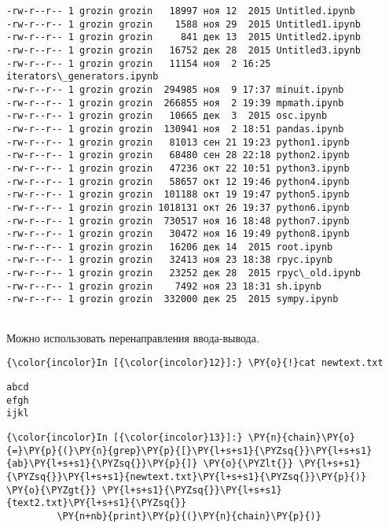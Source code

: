     \begin{Verbatim}[commandchars=\\\{\}]
-rw-r--r-- 1 grozin grozin   18997 ноя 12  2015 Untitled.ipynb
-rw-r--r-- 1 grozin grozin    1588 ноя 29  2015 Untitled1.ipynb
-rw-r--r-- 1 grozin grozin     841 дек 13  2015 Untitled2.ipynb
-rw-r--r-- 1 grozin grozin   16752 дек 28  2015 Untitled3.ipynb
-rw-r--r-- 1 grozin grozin   11154 ноя  2 16:25 iterators\_generators.ipynb
-rw-r--r-- 1 grozin grozin  294985 ноя  9 17:37 minuit.ipynb
-rw-r--r-- 1 grozin grozin  266855 ноя  2 19:39 mpmath.ipynb
-rw-r--r-- 1 grozin grozin   10665 дек  3  2015 osc.ipynb
-rw-r--r-- 1 grozin grozin  130941 ноя  2 18:51 pandas.ipynb
-rw-r--r-- 1 grozin grozin   81013 сен 21 19:23 python1.ipynb
-rw-r--r-- 1 grozin grozin   68480 сен 28 22:18 python2.ipynb
-rw-r--r-- 1 grozin grozin   47236 окт 22 10:51 python3.ipynb
-rw-r--r-- 1 grozin grozin   58657 окт 12 19:46 python4.ipynb
-rw-r--r-- 1 grozin grozin  101188 окт 19 19:47 python5.ipynb
-rw-r--r-- 1 grozin grozin 1018131 окт 26 19:37 python6.ipynb
-rw-r--r-- 1 grozin grozin  730517 ноя 16 18:48 python7.ipynb
-rw-r--r-- 1 grozin grozin   30472 ноя 16 19:49 python8.ipynb
-rw-r--r-- 1 grozin grozin   16206 дек 14  2015 root.ipynb
-rw-r--r-- 1 grozin grozin   32413 ноя 23 18:38 rpyc.ipynb
-rw-r--r-- 1 grozin grozin   23252 дек 28  2015 rpyc\_old.ipynb
-rw-r--r-- 1 grozin grozin    7492 ноя 23 18:31 sh.ipynb
-rw-r--r-- 1 grozin grozin  332000 дек 25  2015 sympy.ipynb


    \end{Verbatim}

    Можно использовать перенаправления ввода-вывода.

    \begin{Verbatim}[commandchars=\\\{\}]
{\color{incolor}In [{\color{incolor}12}]:} \PY{o}{!}cat newtext.txt
\end{Verbatim}


    \begin{Verbatim}[commandchars=\\\{\}]
abcd
efgh
ijkl

    \end{Verbatim}

    \begin{Verbatim}[commandchars=\\\{\}]
{\color{incolor}In [{\color{incolor}13}]:} \PY{n}{chain}\PY{o}{=}\PY{p}{(}\PY{n}{grep}\PY{p}{[}\PY{l+s+s1}{\PYZsq{}}\PY{l+s+s1}{ab}\PY{l+s+s1}{\PYZsq{}}\PY{p}{]} \PY{o}{\PYZlt{}} \PY{l+s+s1}{\PYZsq{}}\PY{l+s+s1}{newtext.txt}\PY{l+s+s1}{\PYZsq{}}\PY{p}{)} \PY{o}{\PYZgt{}} \PY{l+s+s1}{\PYZsq{}}\PY{l+s+s1}{text2.txt}\PY{l+s+s1}{\PYZsq{}}
         \PY{n+nb}{print}\PY{p}{(}\PY{n}{chain}\PY{p}{)}
\end{Verbatim}


